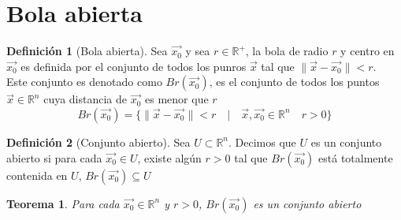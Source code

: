 \documentclass[letterpaper]{article}
\providecommand{\norm}[1]{\lVert#1\rVert}
\newcommand{\R}{\mathds{R}}
\renewcommand{\*}{\cdot}
\newtheorem{theorem}{Teorema}[section]
\theoremstyle{definition}
\newtheorem{definition}{Definición}
\begin{document}
\section{Bola abierta}
\begin{definition}[Bola abierta]
	Sea $ \vec{x_0} $ y sea $ r \in \R^+ $, la bola de radio $ r $ y centro en $ \vec{x_0} $ es definida por el conjunto de todos los punros $ \vec{x} $ tal que $ \norm{\vec{x} - \vec{x_0}} < r $.\\
	Este conjunto es denotado como $ Br(\vec{x_0}) $, es el conjunto de todos los puntos $ \vec{x} \in \R^n $ cuya distancia de $ \vec{x_0} $ es menor que $ r $
	\[ Br(\vec{x_0}) = \{  \norm{\vec{x} - \vec{x_0}} < r \quad | \quad \vec{x}, \vec{x_0} \in \R^n \quad r > 0 \} \]
\end{definition}
%
%
\begin{definition}[Conjunto abierto]
	Sea $ U \subset \R^n $. Decimos que $ U $ es un conjunto abierto si para cada $ \vec{x_0} \in U $, existe algún $ r > 0 $ tal que $ Br(\vec{x_0}) $ está totalmente contenida en $ U $, $ Br(\vec{x_0}) \subseteq U $
\end{definition}
%
%
\begin{theorem}
	Para cada $ \vec{x_0} \in \R^n $ y $ r >0 $, $ Br(\vec{x_0})  $ es un conjunto abierto
\end{theorem}
\end{document}
